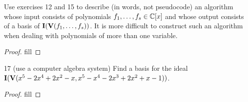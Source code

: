 \begin{exercise}{16}
Use exercises 12 and 15 to describe (in words, not pseudocode) an algorithm whose input consists of polynomials $f_1,\dots,f_s\in\mathbb{C}[x]$ and whose output consists of a basis of $\mathbf{I}(\mathbf{V}(f_1,\dots,f_s))$. It is more difficult to construct such an algorithm when dealing with polynomials of more than one variable.
\end{exercise}
\begin{proof}
fill
\end{proof}

\begin{exercise}{17}
17 (use a computer algebra system)
Find a basis for the ideal $\mathbf{I}(\mathbf{V}(x^5-2x^4+2x^2-x, x^5-x^4-2x^3+2x^2+x-1))$.
\end{exercise}
\begin{proof}
fill
\end{proof}